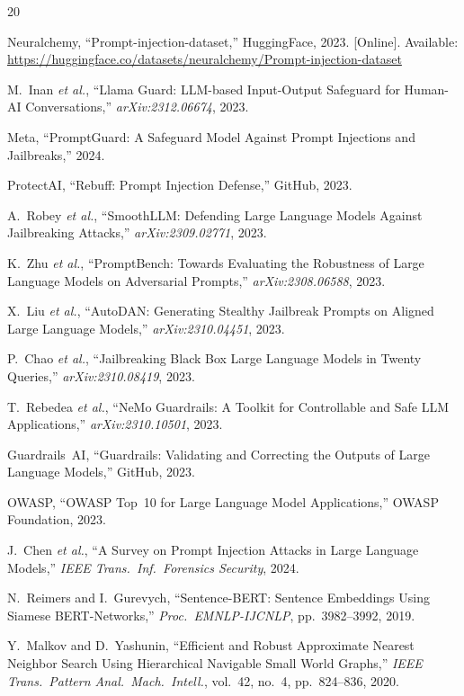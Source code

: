 \documentclass[conference]{IEEEtran}
\begin{document}
\begin{thebibliography}{20}

Neuralchemy, ``Prompt-injection-dataset,'' HuggingFace, 2023. [Online].
Available: \url{https://huggingface.co/datasets/neuralchemy/Prompt-injection-dataset}

M.~Inan \textit{et al.}, ``Llama Guard: LLM-based Input-Output
Safeguard for Human-AI Conversations,''
\textit{arXiv:2312.06674}, 2023.

Meta, ``PromptGuard: A Safeguard Model Against Prompt Injections and
Jailbreaks,'' 2024.

ProtectAI, ``Rebuff: Prompt Injection Defense,'' GitHub, 2023.

A.~Robey \textit{et al.}, ``SmoothLLM: Defending Large Language
Models Against Jailbreaking Attacks,''
\textit{arXiv:2309.02771}, 2023.

K.~Zhu \textit{et al.}, ``PromptBench: Towards Evaluating the
Robustness of Large Language Models on Adversarial Prompts,''
\textit{arXiv:2308.06588}, 2023.

X.~Liu \textit{et al.}, ``AutoDAN: Generating Stealthy Jailbreak
Prompts on Aligned Large Language Models,''
\textit{arXiv:2310.04451}, 2023.

P.~Chao \textit{et al.}, ``Jailbreaking Black Box Large Language
Models in Twenty Queries,'' \textit{arXiv:2310.08419}, 2023.

T.~Rebedea \textit{et al.}, ``NeMo Guardrails: A Toolkit for
Controllable and Safe LLM Applications,''
\textit{arXiv:2310.10501}, 2023.

Guardrails~AI, ``Guardrails: Validating and Correcting the Outputs
of Large Language Models,'' GitHub, 2023.

OWASP, ``OWASP Top~10 for Large Language Model Applications,''
OWASP Foundation, 2023.

J.~Chen \textit{et al.}, ``A Survey on Prompt Injection Attacks in
Large Language Models,'' \textit{IEEE Trans.\ Inf.\ Forensics
Security}, 2024.

N.~Reimers and I.~Gurevych, ``Sentence-BERT: Sentence Embeddings
Using Siamese BERT-Networks,'' \textit{Proc.\ EMNLP-IJCNLP},
pp.~3982--3992, 2019.

Y.~Malkov and D.~Yashunin, ``Efficient and Robust Approximate
Nearest Neighbor Search Using Hierarchical Navigable Small World
Graphs,'' \textit{IEEE Trans.\ Pattern Anal.\ Mach.\ Intell.},
vol.~42, no.~4, pp.~824--836, 2020.


\end{thebibliography}
\end{document}
